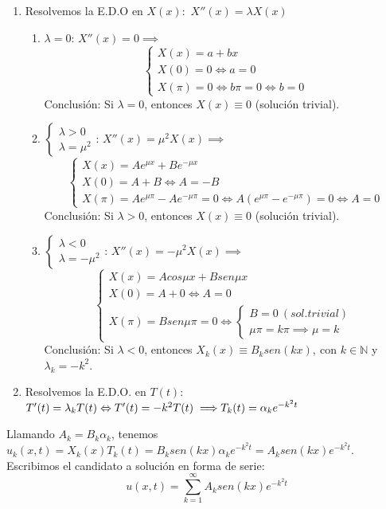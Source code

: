 \documentclass[bibnumbers, palatino]{apuntes}
\begin{document}
\begin{enumerate}
\item Resolvemos la E.D.O en $X(x)$:~$X''(x) = \lambda X(x)$
\begin{enumerate}
\item $\lambda = 0$: $X''(x) = 0 \implies$ \[ \begin{cases}X(x) = a + bx\\ X(0) = 0 \Leftrightarrow a = 0\\X(\pi) = 0 \Leftrightarrow b\pi = 0 \Leftrightarrow b = 0 \end{cases}\]
Conclusión: Si $\lambda  = 0$, entonces $X(x)\equiv 0$ (solución trivial).
\item $\begin{cases}\lambda > 0\\ \lambda = \mu^2\end{cases}$: $X''(x) = \mu^2 X(x) \implies$ \[ \begin{cases}X(x) = Ae^{\mu x} + Be^{-\mu x}\\ X(0) = A + B \Leftrightarrow A = -B\\X(\pi) = Ae^{\mu \pi} - Ae^{-\mu \pi}  = 0 \Leftrightarrow A(e^{\mu \pi} - e^{-\mu \pi} ) = 0 \Leftrightarrow A  = 0 \end{cases}\]
Conclusión: Si $\lambda  > 0$, entonces $X(x)\equiv 0$ (solución trivial).
\item $\begin{cases}\lambda < 0\\ \lambda = -\mu^2\end{cases}$: $X''(x) = -\mu^2 X(x) \implies$ \[ \begin{cases}X(x) = Acos{\mu x} + Bsen{\mu x}\\ X(0) = A + 0 \Leftrightarrow A = 0\\X(\pi) = Bsen{\mu \pi}  = 0 \Leftrightarrow  \begin{cases}B = 0~(sol. trivial) \\ \mu\pi = k\pi \implies \mu = k \end{cases}\end{cases}\]
Conclusión: Si $\lambda  < 0$, entonces $X_k(x)\equiv B_ksen(kx),~$con $k\in \mathbb{N}$ y $\lambda_k = -k^2$.
\end{enumerate}

\item Resolvemos la E.D.O. en $T(t)$:~$T'(t) = \lambda_k T(t)\Leftrightarrow T'(t) = -k^2T(t) \implies \\T_k(t) = \alpha_ke^{-k^2t}$ 
\end{enumerate}
Llamando $A_k = B_k\alpha_k$, tenemos $u_k(x,t) = X_k(x)T_k(t) = B_ksen(kx)\alpha_ke^{-k^2t} = A_k sen(kx)e^{-k^2t} $.
Escribimos el candidato a solución en forma de serie:
\begin{equation}
u(x,t) = \sum^{\infty}_{k=1}A_ksen(kx)e^{-k^2t}
\label{eq}
\end{equation}
\end{document}
